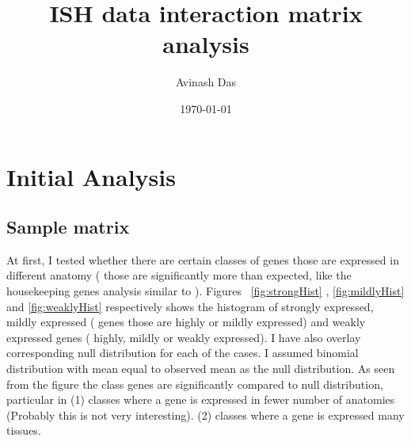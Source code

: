 \documentclass{article}
\title{
ISH data interaction matrix analysis
}
\author{Avinash Das}
\date{\today}
\begin{document}
\pagestyle{fancy}

\maketitle

\section{Initial Analysis}
\subsection{Sample matrix}
At first, I tested whether there are certain classes of genes those are expressed in different anatomy ( those are significantly more than expected, like the housekeeping genes analysis similar to \cite{eisenberg2003human}). Figures ~\ref{fig:strongHist} , \ref{fig:mildlyHist} and \ref{fig:weaklyHist} respectively shows the histogram of strongly expressed, mildly expressed ( genes those are highly or mildly expressed) and weakly expressed genes ( highly, mildly or weakly expressed).  
I have also overlay corresponding null distribution for each of the cases. I assumed binomial distribution with mean equal to observed mean as the null distribution. 
As seen from the figure the class genes are significantly compared to null distribution, particular in (1) classes where a gene is expressed in fewer number of anatomies (Probably this is not very interesting). (2) classes where a gene is expressed many tissues. 
\end{document}
